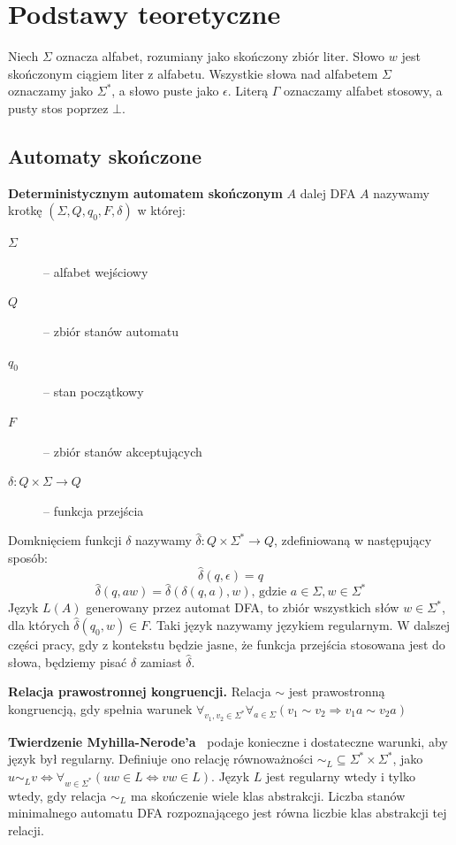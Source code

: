 \chapter{Podstawy teoretyczne}

Niech $\Sigma$ oznacza alfabet, rozumiany jako skończony zbiór liter. Słowo $w$ jest skończonym ciągiem liter z alfabetu.
Wszystkie słowa nad alfabetem $\Sigma$ oznaczamy jako $\Sigma^*$, a słowo puste jako $\epsilon$. Literą $\Gamma$ oznaczamy alfabet stosowy,
a pusty stos poprzez $\bot$.

\section{Automaty skończone}

\textbf{Deterministycznym automatem skończonym} $A$ dalej DFA $A$ nazywamy krotkę $(\Sigma, Q, q_0, F, \delta)$ w której:
\begin{description}
    \item[$\Sigma$] -- alfabet wejściowy
    \item[$Q$] -- zbiór stanów automatu
    \item[$q_0$] -- stan początkowy
    \item[$F$] -- zbiór stanów akceptujących
    \item[$\delta : Q \times \Sigma \to Q$] -- funkcja przejścia
\end{description}

Domknięciem funkcji $\delta$ nazywamy $\widehat{\delta}: Q \times \Sigma^* \to Q$, zdefiniowaną w następujący sposób:
$$\widehat{\delta}(q, \epsilon) = q$$
$$\widehat{\delta}(q, aw) = \widehat{\delta}(\delta(q, a), w) \text{,\ gdzie\ } a \in \Sigma, w \in \Sigma^*$$
Język $L(A)$ generowany przez automat DFA, to zbiór wszystkich słów $w \in \Sigma^*$, dla których $\widehat{\delta}(q_0, w) \in F$.
Taki język nazywamy językiem regularnym. W dalszej części pracy, gdy z kontekstu będzie jasne, że funkcja przejścia
stosowana jest do słowa, będziemy pisać $\delta$ zamiast $\widehat{\delta}$.

\textbf{Relacja prawostronnej kongruencji.} Relacja $\sim$ jest prawostronną kongruencją, gdy spełnia warunek $\forall_{v_1, v_2 \in \Sigma^*} \forall_{a \in \Sigma}(v_1 \sim v_2 \Rightarrow v_1a \sim v_2a)$

\textbf{Twierdzenie Myhilla-Nerode'a~\cite{Myhill-Nerode}} podaje konieczne i dostateczne warunki, aby język był regularny.
Definiuje ono relację równoważności $\sim_L \subseteq\Sigma^*\times\Sigma^*$, jako $u \sim_L v \Leftrightarrow \forall_{w \in\Sigma^*}(uw \in L \Leftrightarrow vw \in L)$.
Język $L$ jest regularny wtedy i tylko wtedy, gdy relacja $\sim_L$ ma skończenie wiele klas abstrakcji. Liczba stanów minimalnego
automatu DFA rozpoznającego jest równa liczbie klas abstrakcji tej relacji.

